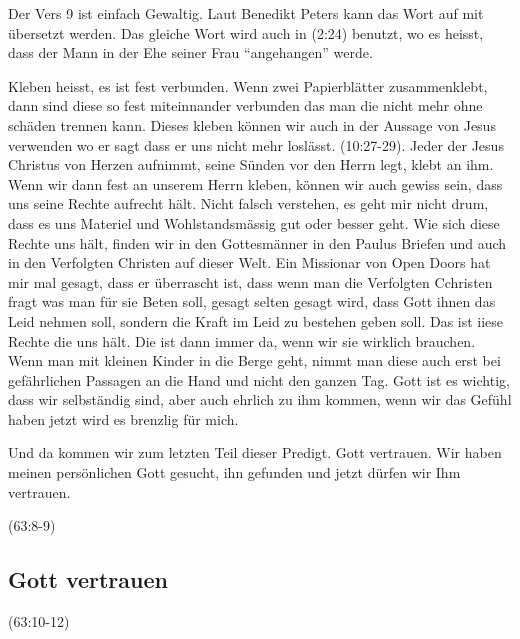 \documentclass[14pt]{../../inc/mybib}
\begin{document}
    \begin{block}
        Der Vers 9 ist einfach Gewaltig. Laut Benedikt Peters kann das Wort  auf mit  übersetzt werden. Das gleiche Wort wird auch in (2:24) benutzt, wo es heisst, dass der Mann in der Ehe seiner Frau \enquote{angehangen} werde.

        Kleben heisst, es ist fest verbunden. Wenn zwei Papierblätter zusammenklebt, dann sind diese so fest miteinnander verbunden das man die nicht mehr ohne schäden trennen kann. Dieses kleben können wir auch in der Aussage von Jesus verwenden wo er sagt dass er uns nicht mehr loslässt. (10:27-29). Jeder der Jesus Christus von Herzen aufnimmt, seine Sünden vor den Herrn legt, klebt an ihm. Wenn wir dann fest an unserem Herrn kleben, können wir auch gewiss sein, dass uns seine Rechte aufrecht hält. Nicht falsch verstehen, es geht mir nicht drum, dass es uns Materiel und Wohlstandsmässig gut oder besser geht. Wie sich diese Rechte uns hält, finden wir in den Gottesmänner in den Paulus Briefen und auch in den Verfolgten Christen auf dieser Welt. Ein Missionar von Open Doors hat mir mal gesagt, dass er überrascht ist, dass wenn man die Verfolgten Cchristen fragt was man für sie Beten soll, gesagt selten gesagt wird, dass Gott ihnen das Leid nehmen soll, sondern die Kraft im Leid zu bestehen geben soll. Das ist iiese Rechte die uns hält. Die ist dann immer da, wenn wir sie wirklich brauchen. Wenn man mit kleinen Kinder in die Berge geht, nimmt man diese auch erst bei gefährlichen Passagen an die Hand und nicht den ganzen Tag. Gott ist es wichtig, dass wir selbständig sind, aber auch ehrlich zu ihm kommen, wenn wir das Gefühl haben jetzt wird es brenzlig für mich.
        
        Und da kommen wir zum letzten Teil dieser Predigt. Gott vertrauen. Wir haben meinen persönlichen Gott gesucht, ihn gefunden und jetzt dürfen wir Ihm vertrauen.
    \end{block}
    (63:8-9)
    \subsection{Gott vertrauen}
    (63:10-12)

   
\end{document}
